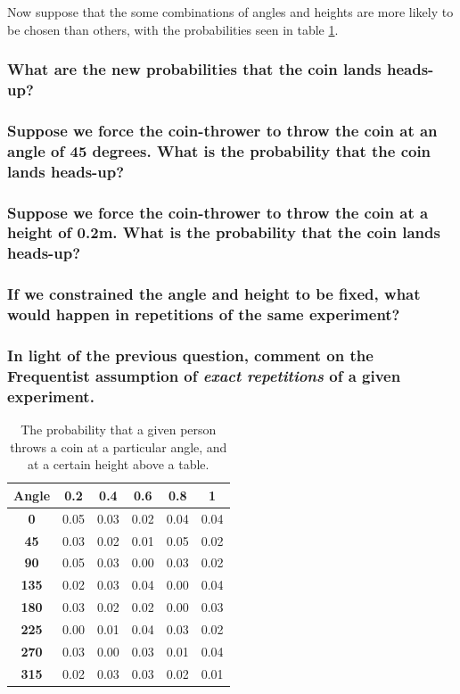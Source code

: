 \documentclass[11pt,fullpage]{book}
\begin{document}
Now suppose that the some combinations of angles and heights are more likely to be chosen than others, with the probabilities seen in table \ref{tab:Intro_PS_coinThrowsFrequency}. 

\subsubsection{What are the new probabilities that the coin lands heads-up?}
\subsubsection{Suppose we force the coin-thrower to throw the coin at an angle of 45 degrees. What is the probability that the coin lands heads-up?}
\subsubsection{Suppose we force the coin-thrower to throw the coin at a height of 0.2m. What is the probability that the coin lands heads-up?}
\subsubsection{If we constrained the angle and height to be fixed, what would happen in repetitions of the same experiment?}
\subsubsection{In light of the previous question, comment on the Frequentist assumption of \textit{exact repetitions} of a given experiment.}

\begin{table}[htbp]
  \centering
    \begin{tabular}{cccccc}
    \toprule
    \textbf{Angle} & \textbf{0.2} & \textbf{0.4} & \textbf{0.6} & \textbf{0.8} & \textbf{1} \\
    \midrule
    \textbf{0} & 0.05  & 0.03  & 0.02  & 0.04  & 0.04 \\
    \textbf{45} & 0.03  & 0.02  & 0.01  & 0.05  & 0.02 \\
    \textbf{90} & 0.05  & 0.03  & 0.00  & 0.03  & 0.02 \\
    \textbf{135} & 0.02  & 0.03  & 0.04  & 0.00  & 0.04 \\
    \textbf{180} & 0.03  & 0.02  & 0.02  & 0.00  & 0.03 \\
    \textbf{225} & 0.00  & 0.01  & 0.04  & 0.03  & 0.02 \\
    \textbf{270} & 0.03  & 0.00  & 0.03  & 0.01  & 0.04 \\
    \textbf{315} & 0.02  & 0.03  & 0.03  & 0.02  & 0.01 \\
    \bottomrule
    \end{tabular}%
  \caption{The probability that a given person throws a coin at a particular angle, and at a certain height above a table.}\label{tab:Intro_PS_coinThrowsFrequency}%
\end{table}%
\end{document}
